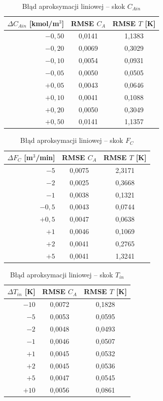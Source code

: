 \documentclass[a4paper,12pt]{article}
\begin{document}
\begin{table}[H]
\centering
\caption{Błąd aproksymacji liniowej -- skok $C_{Ain}$}
\label{tab:1c_1}
\begin{tabular}{r|c|c}
\hline
$\Delta C_{Ain}$ [kmol/m$^3$] & RMSE $C_A$ & RMSE $T$ [K] \\
\hline
$-0{,}50$ & 0{,}0141 & 1{,}1383 \\
$-0{,}20$ & 0{,}0069 & 0{,}3029 \\
$-0{,}10$ & 0{,}0054 & 0{,}0931 \\
$-0{,}05$ & 0{,}0050 & 0{,}0505 \\
$+0{,}05$ & 0{,}0043 & 0{,}0646 \\
$+0{,}10$ & 0{,}0041 & 0{,}1088 \\
$+0{,}20$ & 0{,}0050 & 0{,}3049 \\
$+0{,}50$ & 0{,}0141 & 1{,}1357 \\
\hline
\end{tabular}
\end{table}

\begin{table}[H]
\centering
\caption{Błąd aproksymacji liniowej -- skok $F_C$}
\label{tab:1c_2}
\begin{tabular}{r|c|c}
\hline
$\Delta F_C$ [m$^3$/min] & RMSE $C_A$ & RMSE $T$ [K] \\
\hline
$-5$ & 0{,}0075 & 2{,}3171 \\
$-2$ & 0{,}0025 & 0{,}3668 \\
$-1$ & 0{,}0038 & 0{,}1321 \\
$-0{,}5$ & 0{,}0043 & 0{,}0744 \\
$+0{,}5$ & 0{,}0047 & 0{,}0638 \\
$+1$ & 0{,}0046 & 0{,}1069 \\
$+2$ & 0{,}0041 & 0{,}2765 \\
$+5$ & 0{,}0041 & 1{,}3241 \\
\hline
\end{tabular}
\end{table}

\begin{table}[H]
\centering
\caption{Błąd aproksymacji liniowej -- skok $T_{in}$}
\label{tab:1c_3}
\begin{tabular}{r|c|c}
\hline
$\Delta T_{in}$ [K] & RMSE $C_A$ & RMSE $T$ [K] \\
\hline
$-10$ & 0{,}0072 & 0{,}1828 \\
$-5$ & 0{,}0053 & 0{,}0595 \\
$-2$ & 0{,}0048 & 0{,}0493 \\
$-1$ & 0{,}0046 & 0{,}0507 \\
$+1$ & 0{,}0045 & 0{,}0532 \\
$+2$ & 0{,}0045 & 0{,}0536 \\
$+5$ & 0{,}0047 & 0{,}0545 \\
$+10$ & 0{,}0056 & 0{,}0861 \\
\hline
\end{tabular}
\end{table}
\end{document}
